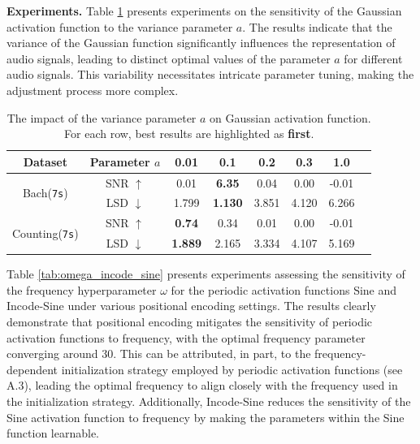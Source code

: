 \documentclass[letterpaper]{article} %
\newcommand{\fs}{\bf}   %
\begin{document}
\textbf{Experiments.} 
Table \ref{tab:a_gaussian} presents experiments on the sensitivity of the Gaussian activation function to the variance parameter \( a \). The results indicate that the variance of the Gaussian function significantly influences the representation of audio signals, leading to distinct optimal values of the parameter \( a \) for different audio signals. This variability necessitates intricate parameter tuning, making the adjustment process more complex.
\begin{table}[!ht]
    \centering
  \tabcolsep=1.0mm
 \fontsize{9}{11}\selectfont
  \begin{tabular}{c|ccccccc}
    \hline
     Dataset & Parameter $a$ & 0.01 &  0.1 & 0.2 & 0.3 & 1.0   \\
    
   \hline
   \multirow{2}{*}{Bach(\texttt{7s})} & SNR $\uparrow$ & 0.01 & \fs 6.35 & 0.04 & 0.00 & -0.01  \\
    & LSD $\downarrow$ & 1.799 & \fs 1.130 & 3.851 & 4.120 & 6.266 \\ 

    \hline
    \multirow{2}{*}{Counting(\texttt{7s})} & SNR $\uparrow$ & \fs 0.74 & 0.34 & 0.01 & 0.00 & -0.01  \\
    & LSD $\downarrow$ & \fs 1.889 & 2.165 & 3.334 & 4.107 & 5.169  \\ 
  \hline
  \end{tabular}
\caption{The impact of the variance parameter \( a \) on Gaussian activation function. For each row, best results are highlighted as  \textbf{first}.}
  \label{tab:a_gaussian}
\end{table}

Table \ref{tab:omega_incode_sine} presents experiments assessing the sensitivity of the frequency hyperparameter \( \omega \) for the periodic activation functions Sine and Incode-Sine under various positional encoding settings. The results clearly demonstrate that positional encoding mitigates the sensitivity of periodic activation functions to frequency, with the optimal frequency parameter converging around 30. This can be attributed, in part, to the frequency-dependent initialization strategy employed by periodic activation functions (see A.3), leading the optimal frequency to align closely with the frequency used in the initialization strategy. Additionally, Incode-Sine reduces the sensitivity of the Sine activation function to frequency by making the parameters within the Sine function learnable.
\end{document}
